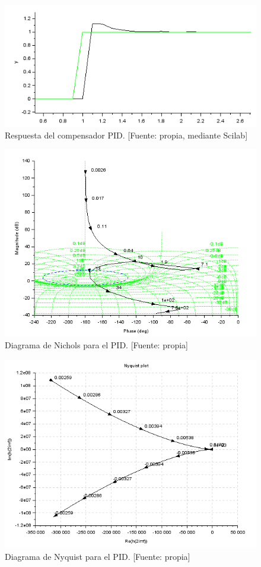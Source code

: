 \documentclass[12pt,letterpaper]{article}
\begin{document}
\begin{figure}[hbtp]
	\centering
	\includegraphics[width = .75 \columnwidth]{resppid.png} 
	\caption[Figura7]{Respuesta del compensador PID. [Fuente: propia, mediante Scilab]} 
	\label{resppid} 
\end{figure}

\begin{figure}[hbtp]
	\centering
	\includegraphics[width = .75 \columnwidth]{nicPID_.png} 
	\caption[Figura7]{Diagrama de Nichols para el PID. [Fuente: propia]} 
	\label{nicPID} 
\end{figure}

\begin{figure}[hbtp]
	\centering
	\includegraphics[width = 0.8 \columnwidth]{nyqpid.png} 
	\caption[Figura7]{Diagrama de Nyquist para el PID. [Fuente: propia]} 
	\label{nyqpid} 
\end{figure}
\end{document}
